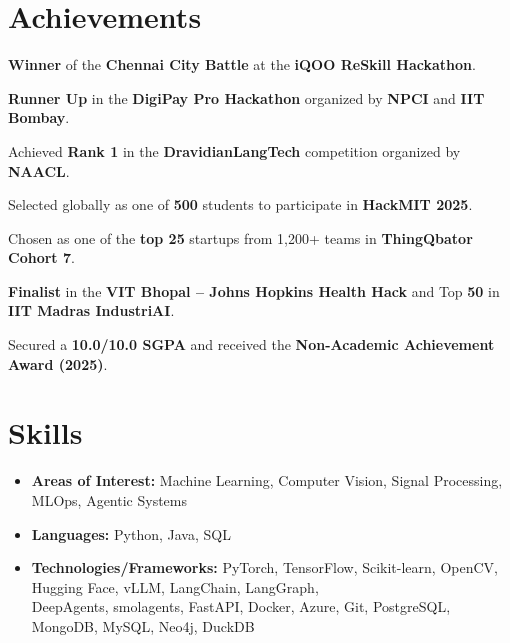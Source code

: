 \documentclass[a4paper,20pt]{article}
\newcommand{\resumeItem}[1]{
  \item\small{#1 \vspace{-2pt}}
}
\newcommand{\resumeSubItem}[2]{\resumeItem{#1}{#2}\vspace{-3pt}}
\newcommand{\resumeSubHeadingListStart}{\begin{itemize}[leftmargin=*]}
\newcommand{\resumeSubHeadingListEnd}{\end{itemize}}
\begin{document}
\section{\textbf{Achievements}}
\begin{description}[font=$\bullet$]
\item {\textbf{Winner} of the \textbf{Chennai City Battle} at the \textbf{iQOO ReSkill Hackathon}.}
\vspace{-2pt}
\item {\textbf{Runner Up} in the \textbf{DigiPay Pro Hackathon} organized by \textbf{NPCI} and \textbf{IIT Bombay}.}
\vspace{-2pt}
\item {Achieved \textbf{Rank 1} in the \textbf{DravidianLangTech} competition organized by \textbf{NAACL}.}
\vspace{-2pt}
\item {Selected globally as one of \textbf{500} students to participate in \textbf{HackMIT 2025}.}
\item {Chosen as one of the \textbf{top 25} startups from 1,200+ teams in \textbf{ThingQbator Cohort 7}.}
\vspace{-2pt}
\item {\textbf{Finalist} in the \textbf{VIT Bhopal – Johns Hopkins Health Hack} and Top \textbf{50} in \textbf{IIT Madras IndustriAI}.}
\vspace{-2pt}
\item {Secured a \textbf{10.0/10.0 SGPA} and received the \textbf{Non-Academic Achievement Award (2025)}.}
\end{description}

\section{\textbf{Skills}}
  \resumeSubHeadingListStart
    \resumeSubItem{\textbf{Areas of Interest:}}{Machine Learning, Computer Vision, Signal Processing, MLOps, Agentic Systems}
    \resumeSubItem{\textbf{Languages:}}{Python, Java, SQL}
    \resumeSubItem{\textbf{Technologies/Frameworks:}}{PyTorch, TensorFlow, Scikit-learn, OpenCV, Hugging Face, vLLM, LangChain, LangGraph, \\[3pt] DeepAgents, smolagents, FastAPI, Docker, Azure, Git, PostgreSQL, MongoDB, MySQL, Neo4j, DuckDB}
  \resumeSubHeadingListEnd


\end{document}
